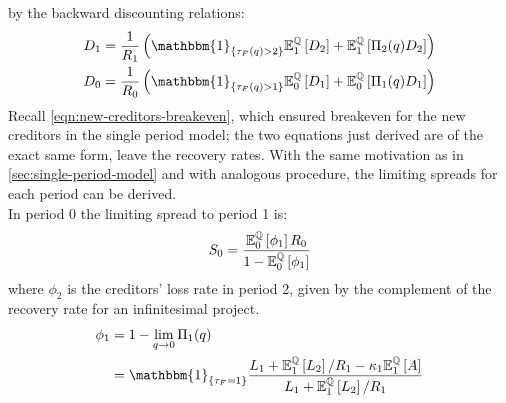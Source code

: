 \documentclass[main.tex]{subfiles}
\begin{document}
        by the backward discounting relations:
        \begin{align*}
            D_{1} 
            &= 
            \frac{1}{R_{1}} 
            \left(
                \mathbbm{1}_{\{\tau_{F}(q) > 2\}} 
                \mathbb{E}_{1}^{\rnmeasure}\left[D_{2}\right] 
                +
                \mathbb{E}_{1}^{\rnmeasure}\left[\Pi_{2}(q)D_{2}\right] 
            \right) \\
            D_{0} 
            &= 
            \frac{1}{R_{0}} 
            \left(
                \mathbbm{1}_{\{\tau_{F}(q) > 1\}} 
                \mathbb{E}_{0}^{\rnmeasure}\left[D_{1}\right] 
                +
                \mathbb{E}_{0}^{\rnmeasure}\left[\Pi_{1}(q)D_{1}\right] 
            \right)
        \end{align*}
        Recall \cref{eqn:new-creditors-breakeven}, 
        which ensured breakeven for the new creditors in the single period model;
        the two equations just derived are of the exact same form, leave the recovery rates. 
        With the same motivation as in \cref{sec:single-period-model} and with analogous procedure,
        the limiting spreads for each period can be derived.
        \\
        In period 0 the limiting spread to period 1 is:
        \begin{equation*}
            S_0 =
            \frac{
                \mathbb{E}_{0}^{\mathbb{Q}}\left[\phi_1\right]R_0
            }{
                1 - \mathbb{E}_{0}^{\mathbb{Q}}\left[\phi_1\right] 
            }
        \end{equation*}
        where $\phi_{2}$ is the creditors' loss rate in period 2,
        given by the complement of the recovery rate for an infinitesimal project.
        \begin{align*}
            \phi_1 
            &=
            1 - \lim_{q\rightarrow0} \Pi_{1}(q) 
            \nonumber \\
            &=
            \mathbbm{1}_{\{\tau_{F}=1\}}
            \frac{
                L_{1}
                +
                \mathbb{E}_{1}^{\rnmeasure}\left[L_{2}\right]/R_1 
                - 
                \kappa_{1}\mathbb{E}_{1}^{\rnmeasure}\left[A\right]
            }{
                L_{1} + \mathbb{E}_{1}^{\rnmeasure}\left[L_{2}\right]/R_1
            }
        \end{align*}
        
\end{document}
